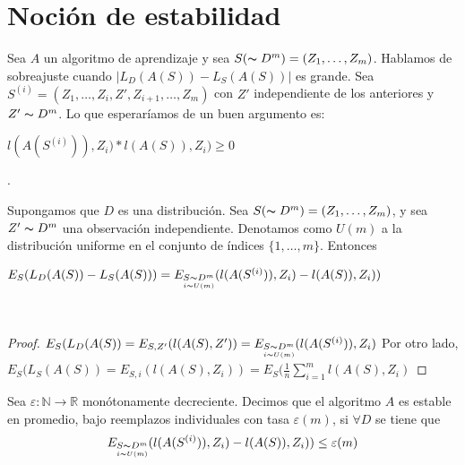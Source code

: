 \section{Noción de estabilidad}
Sea $A$ un algoritmo de aprendizaje y sea $S (\thicksim D^m) = (Z_1,\dots, Z_m)$. Hablamos de sobreajuste cuando $|L_D(A(S))-L_S(A(S))|$ es grande.
Sea $S^{(i)} = (Z_1,\dots,Z_i,{Z'}, Z_{i+1},\dots,Z_m)$ con ${Z'}$ independiente de los anteriores y  ${Z'} \thicksim D^m$. Lo que esperaríamos de un buen argumento es:
\begin{center}
    $l(A(S^{(i)})),Z_i)*l(A(S)),Z_i) \geq 0$
\end{center}.

\begin{theorem}
Supongamos que $D$ es una distribución. Sea $S (\thicksim D^m) = (Z_1,\dots, Z_m)$, y sea ${Z'} \thicksim D^m$ una observación independiente. Denotamos como $U(m)$ a la distribución uniforme en el conjunto de índices $\{1,\dots,m\}$. Entonces

\begin{center}
$E_S(L_D(A(S)) - L_S(A(S))) = E_{\underset{i\thicksim U(m)}{S \thicksim D^m}}(l(A(S^{(i)})),Z_i) - l(A(S)),Z_i))$
\end{center}

\end{theorem}
\\

\begin{proof}
$E_S(L_D(A(S)) = E_{S,{Z'}}(l(A(S),{Z'})) = E_{\underset{i\thicksim U(m)}{S \thicksim D^m}}(l(A(S^{(i)})),Z_i)$
Por otro lado, $E_S(L_S(A(S)) = E_{S,i}(l(A(S),Z_i)) = E_S(\frac{1}{n} \sum_{i=1}^m l(A(S),Z_i)$
\end{proof}

\begin{definition}
Sea $\varepsilon :\mathbb{N} \rightarrow \mathbb{R}$ monótonamente decreciente. Decimos que el algoritmo $A$ es estable en promedio, bajo reemplazos individuales con tasa $\varepsilon(m)$, si $\forall D$ se tiene que $$E_{\underset{i\thicksim U(m)}{S \thicksim D^m}}(l(A(S^{(i)})),Z_i) - l(A(S)),Z_i)) \leq \varepsilon(m) $$
\end{definition}

